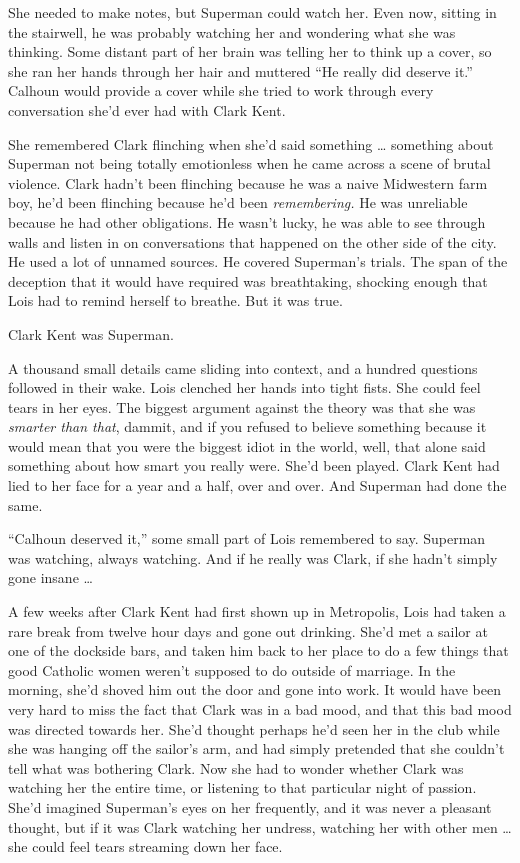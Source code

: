She needed to make notes, but Superman could watch her. Even now,
sitting in the stairwell, he was probably watching her and wondering
what she was thinking. Some distant part of her brain was telling her to
think up a cover, so she ran her hands through her hair and muttered
``He really did deserve it.'' Calhoun would provide a cover while she
tried to work through every conversation she'd ever had with Clark Kent.

She remembered Clark flinching when she'd said something \ldots{}
something about Superman not being totally emotionless when he came
across a scene of brutal violence. Clark hadn't been flinching because
he was a naive Midwestern farm boy, he'd been flinching because he'd
been \emph{remembering.} He was unreliable because he had other
obligations. He wasn't lucky, he was able to see through walls and
listen in on conversations that happened on the other side of the city.
He used a lot of unnamed sources. He covered Superman's trials. The span
of the deception that it would have required was breathtaking, shocking
enough that Lois had to remind herself to breathe. But it was true.

Clark Kent was Superman.

A thousand small details came sliding into context, and a hundred
questions followed in their wake. Lois clenched her hands into tight
fists. She could feel tears in her eyes. The biggest argument against
the theory was that she was \emph{smarter than that}, dammit, and if you
refused to believe something because it would mean that you were the
biggest idiot in the world, well, that alone said something about how
smart you really were. She'd been played. Clark Kent had lied to her
face for a year and a half, over and over. And Superman had done the
same.

``Calhoun deserved it,'' some small part of Lois remembered to say.
Superman was watching, always watching. And if he really was Clark, if
she hadn't simply gone insane \ldots{}

A few weeks after Clark Kent had first shown up in Metropolis, Lois had
taken a rare break from twelve hour days and gone out drinking. She'd
met a sailor at one of the dockside bars, and taken him back to her
place to do a few things that good Catholic women weren't supposed to do
outside of marriage. In the morning, she'd shoved him out the door and
gone into work. It would have been very hard to miss the fact that Clark
was in a bad mood, and that this bad mood was directed towards her.
She'd thought perhaps he'd seen her in the club while she was hanging
off the sailor's arm, and had simply pretended that she couldn't tell
what was bothering Clark. Now she had to wonder whether Clark was
watching her the entire time, or listening to that particular night of
passion. She'd imagined Superman's eyes on her frequently, and it was
never a pleasant thought, but if it was Clark watching her undress,
watching her with other men \ldots{} she could feel tears streaming down
her face.

